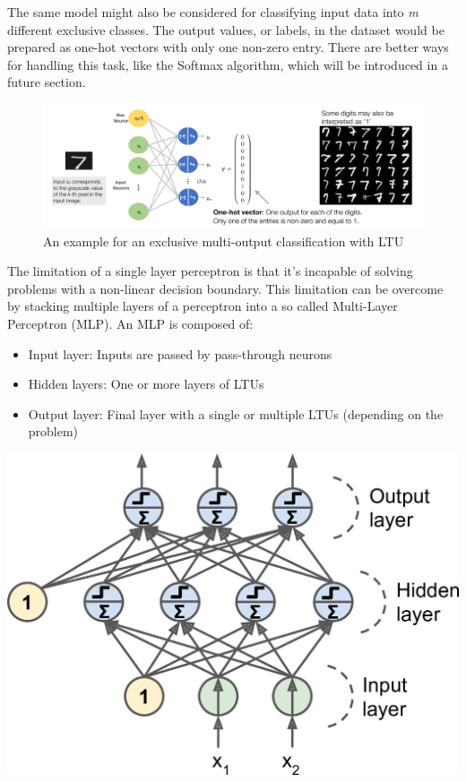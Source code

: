 \documentclass[11pt]{article}
\begin{document}
The same model might also be considered for classifying input data into \emph{m} different exclusive classes. The output values, or labels, in the dataset would be prepared as one-hot vectors with only one non-zero entry. There are better ways for handling this task, like the Softmax algorithm, which will be introduced in a future section.

\begin{figure}[htb]
	\centering
	\includegraphics[width=0.8\linewidth, keepaspectratio]{img/exclusive_multioutput_classifier_ltu}
	\caption{An example for an exclusive multi-output classification with LTU}
	\label{fig:exclusivemultioutputbinaryclassifier}
\end{figure}

\begin{minipage}{0.5\textwidth}
	The limitation of a single layer perceptron is that it's incapable of solving problems with a non-linear decision boundary. This limitation can be overcome by stacking multiple layers of a perceptron into a so called Multi-Layer Perceptron (MLP). An MLP is composed of:
	\begin{itemize}[label=-]
		\item Input layer: Inputs are passed by pass-through neurons
		\item Hidden layers: One or more layers of LTUs
		\item Output layer: Final layer with a single or multiple LTUs (depending on the problem)
	\end{itemize}
\end{minipage}
\begin{minipage}{0.5\textwidth}
	\centering
	\includegraphics[width=0.9\linewidth, keepaspectratio]{img/multi_layer_perceptron}
\end{minipage}
\end{document}
